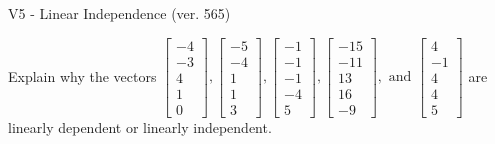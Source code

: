 \begin{exercise}
  \begin{exerciseTitle}V5 - Linear Independence (ver. 565)\end{exerciseTitle}
  \begin{exerciseStatement}
    Explain why the vectors \(\left[\begin{array}{r}
-4 \\
-3 \\
4 \\
1 \\
0
\end{array}\right] , \left[\begin{array}{r}
-5 \\
-4 \\
1 \\
1 \\
3
\end{array}\right] , \left[\begin{array}{r}
-1 \\
-1 \\
-1 \\
-4 \\
5
\end{array}\right] , \left[\begin{array}{r}
-15 \\
-11 \\
13 \\
16 \\
-9
\end{array}\right] , \text{ and } \left[\begin{array}{r}
4 \\
-1 \\
4 \\
4 \\
5
\end{array}\right]\) are linearly dependent or linearly independent.	



\end{exerciseStatement}
\end{exercise}
